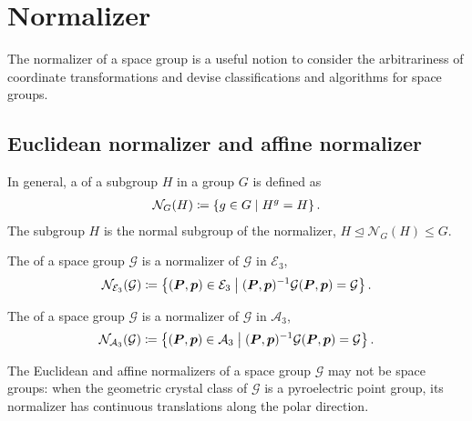 \section{\label{sec:normalizer}Normalizer}

The normalizer of a space group is a useful notion to consider the arbitrariness of coordinate transformations and devise classifications and algorithms for space groups.

\subsection{Euclidean normalizer and affine normalizer}

In general, a  of a subgroup $H$ in a group $G$ is defined as
\begin{align}
  \mathcal{N}_{G}(H) \coloneqq \left\{  g \in G  \mathrel{}\middle|\mathrel{}  H^{g} = H  \right\}.
\end{align}
The subgroup $H$ is the normal subgroup of the normalizer, $H \trianglelefteq \mathcal{N}_{G}(H) \leq G$.

\begin{screen}
  \begin{defn}
    The  of a space group $\mathcal{G}$ is a normalizer of $\mathcal{G}$ in $\mathcal{E}_{3}$,
    \begin{align}
      \mathcal{N}_{\mathcal{E}_{3}}(\mathcal{G}) \coloneqq \left\{  (\bm{P}, \bm{p}) \in \mathcal{E}_{3}  \mathrel{}\middle|\mathrel{}  (\bm{P}, \bm{p})^{-1} \mathcal{G} (\bm{P}, \bm{p}) = \mathcal{G}  \right\}.
    \end{align}
  \end{defn}
\end{screen}

\begin{screen}
  \begin{defn}
    The  of a space group $\mathcal{G}$ is a normalizer of $\mathcal{G}$ in $\mathcal{A}_{3}$,
    \begin{align}
      \mathcal{N}_{\mathcal{A}_{3}}(\mathcal{G}) \coloneqq \left\{  (\bm{P}, \bm{p}) \in \mathcal{A}_{3}  \mathrel{}\middle|\mathrel{}  (\bm{P}, \bm{p})^{-1} \mathcal{G} (\bm{P}, \bm{p}) = \mathcal{G}  \right\}.
    \end{align}
  \end{defn}
\end{screen}

The Euclidean and affine normalizers of a space group $\mathcal{G}$ may not be space groups: when the geometric crystal class of $\mathcal{G}$ is a pyroelectric point group, its normalizer has continuous translations along the polar direction.


